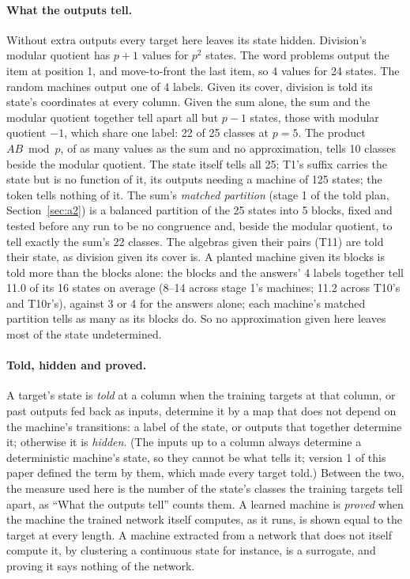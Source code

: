 \documentclass[11pt]{article}
\newcommand{\pn}[2]{#2}
\begin{document}
\paragraph{What the outputs tell.} Without extra outputs every target here leaves its state
hidden. Division's modular quotient has $p + 1$ values for $p^2$ states. The word problems output the item
at position 1, and move-to-front the last item, so 4 values for 24 states. The random machines
output one of 4 labels. Given its cover, division is told its state's coordinates at every column.
Given the sum alone, the sum and the modular quotient together tell apart all but $p - 1$ states, those with modular quotient $-1$, which share one label: 22 of 25 classes at $p = 5$. The product $AB \bmod p$, of as
many values as the sum and no approximation, tells 10 classes beside the modular quotient. The state itself tells all 25; T1's suffix carries the state but
is no function of it, its outputs needing a machine of 125 states; the token tells nothing of it. The
sum's \emph{matched partition} (stage 1 of the told plan, Section~\ref{sec:a2}) is a balanced partition of the 25
states into 5 blocks, fixed and tested before any run to be no congruence and, beside the modular
quotient, to tell exactly the sum's 22 classes. The
algebras given their pairs (T11) are told their state, as division given its cover is. A planted machine given its
blocks is told more than the blocks alone: the blocks and the answers' 4 labels together tell
\pn{told1.classes-mean}{11.0} of its 16 states on average (\pn{told1.classes-range}{8--14} across
stage 1's machines; 11.2 across T10's and T10r's), against 3 or 4 for the answers alone; each machine's
matched partition tells as many as its blocks do. So no approximation given here leaves most of the
state undetermined.

\paragraph{Told, hidden and proved.} A target's state is \emph{told} at a column when the training
targets at that column, or past outputs fed back as inputs, determine it by a map that does not
depend on the machine's transitions: a label of the state, or outputs that together determine it;
otherwise it is \emph{hidden}. (The inputs up to a column always determine a deterministic machine's
state, so they cannot be what tells it; version 1 of this paper defined the term by them, which
made every target told.) Between the two, the measure used here is the number of the state's
classes the training targets tell apart, as ``What the outputs tell'' counts them. A learned machine is \emph{proved} when the machine the trained network itself
computes, as it runs, is shown equal to the target at every length. A machine extracted from a
network that does not itself compute it, by clustering a continuous state for instance, is a
surrogate, and proving it says nothing of the network.
\end{document}
